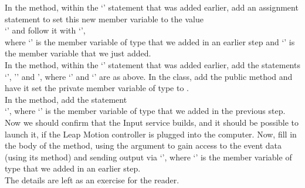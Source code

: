 In the  method, within the `'
statement that was added earlier, add an assignment statement to set this new member
variable to the value\\
`' and
follow it with `',\\
where `' is the member variable of type  that we
added in an earlier step and `' is the member variable that we just added.\\

In the  method, within the `'
statement that was added earlier, add the statements
`', '' and ',
where `' and `' are as above.
\tertiaryEnd
{}
In the  class, add the public method
 and have it set the private member variable of type
 to .\\

In the  method, add the statement\\
`', where `' is the member variable of type
 that we added in the previous step.\\

Now we should confirm that the Input service builds, and it should be possible to launch
it, if the Leap Motion controller is plugged into the computer.
\tertiaryEnd
{}
Now, fill in the body of the  method, using the
 argument to gain access to the event data (using its
 method) and sending output via `', where
`' is the member variable of type  that we
added in an earlier step.\\

The details are left as an exercise for the reader.
\tertiaryEnd
\secondaryEnd
\appendixEnd{}
